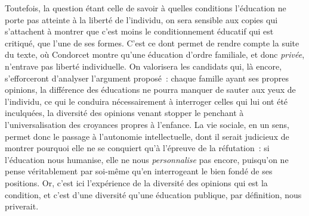 {Toutefois, la question étant celle de savoir à quelles conditions l'éducation ne porte pas atteinte à la liberté de l'individu, on sera sensible aux copies qui s'attachent à montrer que c'est moins le conditionnement éducatif qui est critiqué, que l'une de ses formes. C'est ce dont permet de rendre compte la suite du texte, où Condorcet montre qu'une éducation d'ordre familiale, et donc \emph{privée}, n'entrave pas liberté individuelle. On valorisera les candidats qui, là encore, s'efforceront d'analyser l'argument proposé~: chaque famille ayant ses propres opinions, la différence des éducations ne pourra manquer de sauter aux yeux de l'individu, ce qui le conduira nécessairement à interroger celles qui lui ont été inculquées, la diversité des opinions venant stopper le penchant à l'universalisation des croyances propres à l'enfance. La vie sociale, en un sens, permet donc le passage à l'autonomie intellectuelle, dont il serait judicieux de montrer pourquoi elle ne se conquiert qu'à l'épreuve de la réfutation~: si l'éducation nous humanise, elle ne nous \emph{personnalise} pas encore, puisqu'on ne pense véritablement par soi-même qu'en interrogeant le bien fondé de ses positions. Or, c'est ici l'expérience de la diversité des opinions qui est la condition, et c'est d'une diversité qu'une éducation publique, par définition, nous priverait.}%
